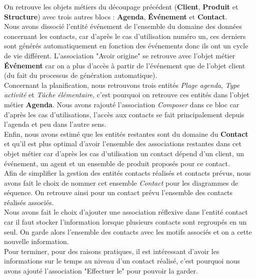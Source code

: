 On retrouve les objets métiers du découpage précédent (\textbf{Client}, \textbf{Produit} et \textbf{Structure}) avec trois autres blocs : \textbf{Agenda}, \textbf{Événement} et \textbf{Contact}. \\

Nous avons dissocié l'entité événement de l'ensemble du domaine des données concernant les contacts, car d'après le cas d'utilisation numéro un, ces derniers sont générés automatiquement en fonction des événements donc ils ont un cycle de vie différent. L'association "Avoir origine" se retrouve avec l'objet métier \textbf{Événement} car on a plus d'accès à partir de l'événement que de l'objet client (du fait du processus de génération automatique). \\

Concernant la planification, nous retrouvons trois entités \textit{Plage agenda}, \textit{Type activité} et \textit{Tâche élémentaire}, c'est pourquoi on retrouve ces entités dans l'objet métier \textbf{Agenda}. Nous avons rajouté l'association \textit{Composer} dans ce bloc car d'après les cas d'utilisations, l'accès aux contacts se fait principalement depuis l'agenda et peu dans l'autre sens. \\

Enfin, nous avons estimé que les entités restantes sont du domaine du \textbf{Contact} et qu'il est plus optimal d'avoir l'ensemble des associations restantes dans cet objet métier car d'après les cas d'utilisation un contact dépend d'un client, un événement, un agent et un ensemble de produit proposés pour ce contact. \\

Afin de simplifier la gestion des entités contacts réalisés et contacts prévus, nous avons fait le choix de nommer cet ensemble \textit{Contact} pour les diagrammes de séquence. On retrouve ainsi pour un contact prévu l'ensemble des contacts réalisés associés. \\

Nous avons fait le choix d'ajouter une association réflexive dans l'entité contact car il faut stocker l'information lorsque plusieurs contacts sont regroupés en un seul. On garde alors l'ensemble des contacts avec les motifs associés et on a cette nouvelle information. \\

Pour terminer, pour des raisons pratiques, il est intéressant d'avoir les informations sur le temps au niveau d'un contact réalisé, c'est pourquoi nous avons ajouté l'association "Effectuer le" pour pouvoir la garder. \\

